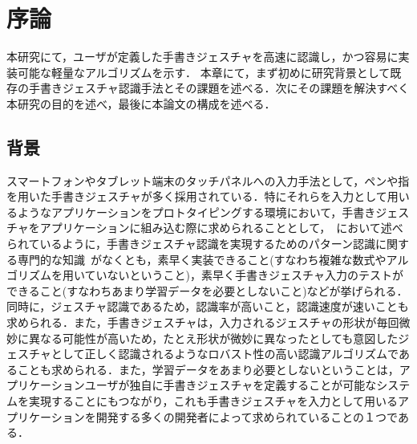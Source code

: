\chapter{序論}
本研究にて，ユーザが定義した手書きジェスチャを高速に認識し，かつ容易に実装可能な軽量なアルゴリズムを示す．
本章にて，まず初めに研究背景として既存の手書きジェスチャ認識手法とその課題を述べる．次にその課題を解決すべく本研究の目的を述べ，最後に本論文の構成を述べる．

\section{背景}
スマートフォンやタブレット端末のタッチパネルへの入力手法として，ペンや指を用いた手書きジェスチャが多く採用されている．特にそれらを入力として用いるようなアプリケーションをプロトタイピングする環境において，手書きジェスチャをアプリケーションに組み込む際に求められることとして，~\cite{Rettig:1994:PTF:175276.175288}において述べられているように，手書きジェスチャ認識を実現するためのパターン認識に関する専門的な知識~\cite{Hong00constructingfinite, Anderson2004HiddenMM,Sezgin:2005:HES:1040830.1040899, Cao:2005:EOA:1089508.1089540, Pittman:1991:RHT:108844.108914, Cho:2006:NGR:1711617.1711649,Rubine:1991:SGE:127719.122753, Anthony:2010:LMR:1839214.1839258}がなくとも，素早く実装できること(すなわち複雑な数式やアルゴリズムを用いていないということ)，素早く手書きジェスチャ入力のテストができること(すなわちあまり学習データを必要としないこと)などが挙げられる．同時に，ジェスチャ認識であるため，認識率が高いこと，認識速度が速いことも求められる．また，手書きジェスチャは，入力されるジェスチャの形状が毎回微妙に異なる可能性が高いため，たとえ形状が微妙に異なったとしても意図したジェスチャとして正しく認識されるようなロバスト性の高い認識アルゴリズムであることも求められる．また，学習データをあまり必要としないということは，アプリケーションユーザが独自に手書きジェスチャを定義することが可能なシステムを実現することにもつながり，これも手書きジェスチャを入力として用いるアプリケーションを開発する多くの開発者によって求められていることの１つである．


